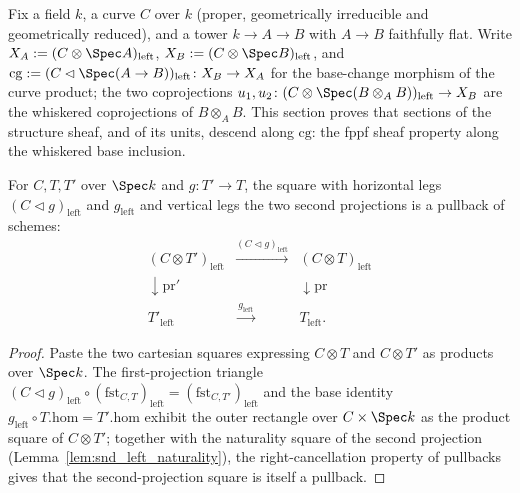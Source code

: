 Fix a field \(k\), a curve \(C\) over \(k\) (proper, geometrically irreducible and geometrically
reduced), and a tower \(k \to A \to B\) with \(A \to B\) faithfully flat. Write \(X_A := (C
\otimes \Spec A)_{\mathrm{left}}\), \(X_B := (C \otimes \Spec B)_{\mathrm{left}}\), and
\(\mathrm{cg} := (C \lhd \Spec(A \to B))_{\mathrm{left}} \colon X_B \to X_A\) for the base-change
morphism of the curve product; the two coprojections \(u_1, u_2 \colon (C \otimes \Spec(B
\otimes_A B))_{\mathrm{left}} \to X_B\) are the whiskered coprojections of \(B \otimes_A B\).
This section proves that sections of the structure sheaf, and of its units, descend along
\(\mathrm{cg}\): the fppf sheaf property along the whiskered base inclusion.

\begin{theorem}
  \label{thm:isPullback_whiskerLeft_snd}
  \leanok
  For \(C, T, T'\) over \(\Spec k\) and \(g \colon T' \to T\), the square with horizontal legs
  \((C \lhd g)_{\mathrm{left}}\) and \(g_{\mathrm{left}}\) and vertical legs the two second
  projections is a pullback of schemes:
  \[
    \begin{array}{ccc}
      (C \otimes T')_{\mathrm{left}} & \xrightarrow{(C \lhd g)_{\mathrm{left}}} &
        (C \otimes T)_{\mathrm{left}} \\
      \downarrow \mathrm{pr}' & & \downarrow \mathrm{pr} \\
      T'_{\mathrm{left}} & \xrightarrow{\ g_{\mathrm{left}}\ } & T_{\mathrm{left}}.
    \end{array}
  \]
\end{theorem}
\begin{proof}
  \leanok
  Paste the two cartesian squares expressing \(C \otimes T\) and \(C \otimes T'\) as products
  over \(\Spec k\).  The first-projection triangle \((C \lhd g)_{\mathrm{left}} \circ
  (\mathrm{fst}_{C,T})_{\mathrm{left}} = (\mathrm{fst}_{C,T'})_{\mathrm{left}}\) and the base
  identity \(g_{\mathrm{left}} \circ T.\mathrm{hom} = T'.\mathrm{hom}\) exhibit the outer
  rectangle over \(C \times \Spec k\) as the product square of \(C \otimes T'\); together with
  the naturality square of the second projection (Lemma~\ref{lem:snd_left_naturality}), the
  right-cancellation property of pullbacks gives that the second-projection square is itself a
  pullback.
\end{proof}

